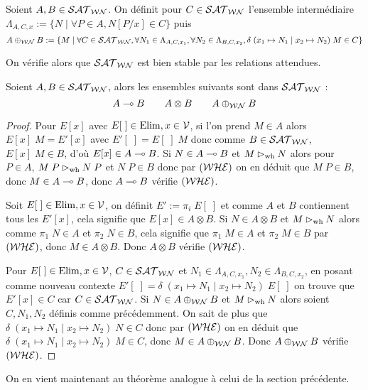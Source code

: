 \begin{defi}
    Soient $A,B\in\mathcal {SAT}_{\mathcal{WN}}$. On définit pour $C\in\mathcal {SAT}_{\mathcal{WN}}$ l'ensemble intermédiaire $\Lambda_{A,C,x} := \{N\mid \forall P\in A,N[P/x]\in C\}$ puis $$A\oplus_\mathcal {WN} B := \{M\mid \forall C\in\mathcal {SAT}_{\mathcal{WN}},\forall N_1\in\Lambda_{A,C,x_1},\forall N_2\in\Lambda_{B,C,x_2},\delta\;(x_1\mapsto N_1\mid x_2\mapsto N_2)\;M\in C\}$$
\end{defi}

On vérifie alors que $\mathcal {SAT}_{\mathcal{WN}}$ est bien stable par les relations attendues.

\begin{lem}
    Soient $A,B\in\mathcal {SAT}_{\mathcal{WN}}$, alors les ensembles suivants sont dans $\mathcal {SAT}_{\mathcal{WN}}$ : $$A\multimap B\qquad A\otimes B\qquad A\oplus_\mathcal {WN} B$$
\end{lem}

\begin{proof}
    Pour $E[x]$ avec $E[\;]\in\mathrm{Elim},x\in\mathcal V$, si l'on prend $M\in A$ alors $E[x]\;M = E'[x]$ avec $E'[\;] = E[\;]\;M$ donc comme $B\in\mathcal {SAT}_{\mathcal{WN}}$, $E[x]\;M\in B$, d'où $E[x]\in A\multimap B$. Si $N\in A\multimap B$ et $M\rhd_{\mathrm{wh}} N$ alors pour $P\in A$, $M\;P\rhd_{\mathrm{wh}} N\;P$ et $N\;P\in B$ donc par $(\mathcal {WHE})$ on en déduit que $M\;P\in B$, donc $M\in A\multimap B$, donc $A\multimap B$ vérifie $(\mathcal {WHE})$.

    Soit $E[\;]\in\mathrm{Elim},x\in\mathcal V$, on définit $E' := \pi_i\;E[\;]$ et comme $A$ et $B$ contiennent tous les $E'[x]$, cela signifie que $E[x]\in A\otimes B$. Si $N\in A\otimes B$ et $M\rhd_{\mathrm{wh}} N$ alors comme $\pi_1\; N\in A$ et $\pi_2\;N\in B$, cela signifie que $\pi_1\;M\in A$ et $\pi_2\;M\in B$ par $(\mathcal {WHE})$, donc $M\in A\otimes B$. Donc $A\otimes B$ vérifie $(\mathcal {WHE})$.

    Pour $E[\;]\in\mathrm{Elim},x\in\mathcal V$, $C\in\mathcal {SAT}_{\mathcal{WN}}$ et $N_1\in \Lambda_{A,C,x_1},N_2\in\Lambda_{B,C,x_2}$, en posant comme nouveau contexte $E'[\;] = \delta\;(x_1\mapsto N_1\mid x_2\mapsto N_2)\;E[\;]$ on trouve que $E'[x]\in C$ car $C\in\mathcal {SAT}_{\mathcal{WN}}$. Si $N\in A\oplus_\mathcal {WN} B$ et $M\rhd_{\mathrm{wh}} N$ alors soient $C,N_1,N_2$ définis comme précédemment. On sait de plus que $\delta\;(x_1\mapsto N_1\mid x_2\mapsto N_2)\; N\in C$ donc par $(\mathcal {WHE})$ on en déduit que $\delta\;(x_1\mapsto N_1\mid x_2\mapsto N_2)\; M\in C$, donc $M\in A\oplus_{\mathcal {WN}} B$. Donc $A\oplus_\mathcal {WN} B$ vérifie $(\mathcal {WHE})$.
\end{proof}

On en vient maintenant au théorème analogue à celui de la section précédente.

